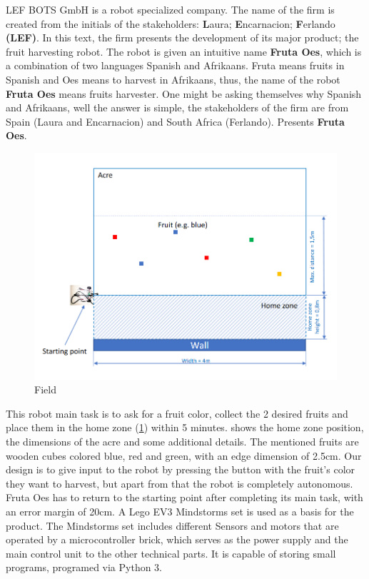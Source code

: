 \noindent LEF BOTS GmbH is a robot specialized company. The name of the firm is created from the initials of the stakeholders: \textbf{L}aura; \textbf{E}ncarnacion; \textbf{F}erlando \textbf{(LEF)}. In this text, the firm presents the development of its major product; the fruit harvesting robot. The robot is given an intuitive name \textbf{Fruta Oes}, which is a combination of two languages Spanish and Afrikaans. Fruta means fruits in Spanish and Oes means to harvest in Afrikaans, thus, the name of the robot \textbf{Fruta Oes} means fruits harvester. One might be asking themselves why Spanish and Afrikaans, well the answer is simple, the stakeholders of the firm are from Spain (Laura and Encarnacion) and South Africa (Ferlando).  Presents \textbf{Fruta Oes}.\\

\begin{figure}[!ht]
	\centering
	\includegraphics[width=0.8\linewidth]{Graphics/acre}
	\caption{Field \cite{mm}}
	\label{fig:field}
\end{figure}

\noindent This robot main task is to ask for a fruit color, collect the 2 desired fruits and place them in the home zone (\cref{fig:field}) within 5 minutes.  shows the home zone position, the dimensions of the acre and some additional details. The mentioned fruits are wooden cubes colored blue, red and green, with an edge dimension of 2.5cm. Our design is to give input to the robot by pressing the button with the fruit’s color they want to harvest, but apart from that the robot is completely autonomous. Fruta Oes has to return to the starting point after completing its main task, with an error margin of  20cm. 
A Lego EV3 Mindstorms set is used as a basis for the product. The Mindstorms set includes different Sensors and motors that are operated by a microcontroller brick, which serves as the power supply and the main control unit to the other technical parts. It is capable of storing small programs, programed via Python 3. 


